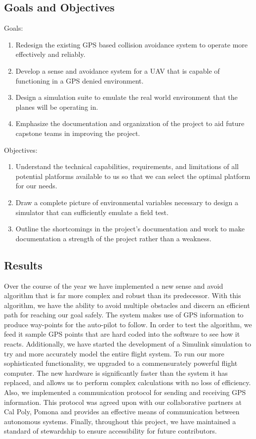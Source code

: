 \documentclass[12pt]{article}
\begin{document}
\subsection{Goals and Objectives}
Goals:
\begin{enumerate}
\item Redesign the existing GPS based collision avoidance system to operate more effectively and reliably.
\item Develop a sense and avoidance system for a UAV that is capable of functioning in a GPS denied environment.
\item Design a simulation suite to emulate the real world environment that the planes will be operating in.
\item Emphasize the documentation and organization of the project to aid future capstone teams in improving the project.
\end{enumerate}
Objectives:
\begin{enumerate}
\item Understand the technical capabilities, requirements, and limitations of all potential platforms available to us so that we can select the optimal platform for our needs.
\item Draw a complete picture of environmental variables necessary to design a simulator that can sufficiently emulate a field test.
\item Outline the shortcomings in the project's documentation and work to make documentation a strength of the project rather than a weakness.
\end{enumerate}

\subsection{Results}
Over the course of the year we have implemented a new sense and avoid algorithm that is far more complex and robust than its predecessor. With this algorithm, we have the ability to avoid multiple obstacles and discern an efficient path for reaching our goal safely. The system makes use of GPS information to produce way-points for the auto-pilot to follow. In order to test the algorithm, we feed it sample GPS points that are hard coded into the software to see how it reacts. Additionally, we have started the development of a Simulink simulation to try and more accurately model the entire flight system. To run our more sophisticated functionality, we upgraded to a commensurately powerful flight computer. The new hardware is significantly faster than the system it has replaced, and allows us to perform complex calculations with no loss of efficiency. Also, we implemented a communication protocol for sending and receiving GPS information. This protocol was agreed upon with our collaborative partners at Cal Poly, Pomona and provides an effective means of communication between autonomous systems. Finally, throughout this project, we have maintained a standard of stewardship to ensure accessibility for future contributors. 
\end{document}
